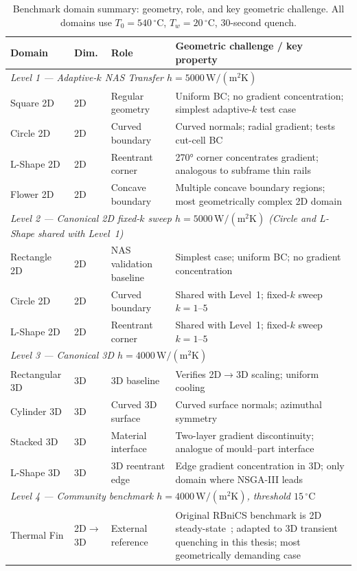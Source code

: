 \begin{table}[H]
\centering\small\setlength{\tabcolsep}{4pt}
\caption{Benchmark domain summary: geometry, role, and key geometric challenge.
All domains use $T_0=540\,^\circ\mathrm{C}$, $T_w=20\,^\circ\mathrm{C}$, 30-second quench.}
\label{tab:domain_overview}
\begin{tabular}{@{}llp{3.5cm}p{6.5cm}@{}}
\toprule
\textbf{Domain} & \textbf{Dim.} & \textbf{Role} & \textbf{Geometric challenge / key property} \\
\midrule
\multicolumn{4}{l}{\textit{Level 1 — Adaptive-$k$ NAS Transfer \quad $h=5000\,\mathrm{W/(m^2K)}$}} \\
\midrule
Square 2D      & 2D & Regular geometry        & Uniform BC; no gradient concentration; simplest adaptive-$k$ test case \\
Circle 2D      & 2D & Curved boundary         & Curved normals; radial gradient; tests cut-cell BC \\
L-Shape 2D     & 2D & Reentrant corner        & 270° corner concentrates gradient; analogous to subframe thin rails \\
Flower 2D      & 2D & Concave boundary        & Multiple concave boundary regions; most geometrically complex 2D domain \\
\midrule
\multicolumn{4}{l}{\textit{Level 2 — Canonical 2D fixed-$k$ sweep \quad $h=5000\,\mathrm{W/(m^2K)}$ \quad (Circle and L-Shape shared with Level~1)}} \\
\midrule
Rectangle 2D   & 2D & NAS validation baseline & Simplest case; uniform BC; no gradient concentration \\
Circle 2D      & 2D & Curved boundary         & Shared with Level~1; fixed-$k$ sweep $k=1$--$5$ \\
L-Shape 2D     & 2D & Reentrant corner        & Shared with Level~1; fixed-$k$ sweep $k=1$--$5$ \\
\midrule
\multicolumn{4}{l}{\textit{Level 3 — Canonical 3D \quad $h=4000\,\mathrm{W/(m^2K)}$}} \\
\midrule
Rectangular 3D & 3D & 3D baseline             & Verifies 2D$\to$3D scaling; uniform cooling \\
Cylinder 3D    & 3D & Curved 3D surface       & Curved surface normals; azimuthal symmetry \\
Stacked 3D     & 3D & Material interface      & Two-layer gradient discontinuity; analogue of mould--part interface \\
L-Shape 3D     & 3D & 3D reentrant edge       & Edge gradient concentration in 3D; only domain where NSGA-III leads \\
\midrule
\multicolumn{4}{l}{\textit{Level 4 — Community benchmark \quad $h=4000\,\mathrm{W/(m^2K)}$, threshold $15\,^\circ\mathrm{C}$}} \\
\midrule
Thermal Fin    & 2D$\to$3D & External reference  & Original RBniCS benchmark is 2D steady-state~\cite{maday2004thermalfin}; adapted to 3D transient quenching in this thesis; most geometrically demanding case \\
\bottomrule
\end{tabular}
\end{table}


